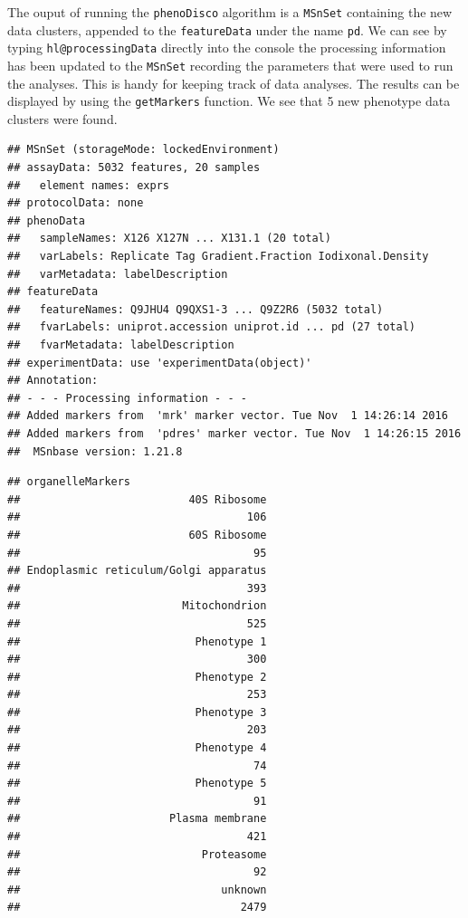 The ouput of running the \texttt{phenoDisco} algorithm is a \texttt{MSnSet}
containing the new data clusters, appended to the \texttt{featureData} under
the name \texttt{pd}. We can see by typing \texttt{hl@processingData} directly into
the console the processing information has been updated to the
\texttt{MSnSet} recording the parameters that were used to run the analyses.
This is handy for keeping track of data analyses. The results can be
displayed by using the \texttt{getMarkers} function. We see that 5 new
phenotype data clusters were found.

\begin{knitrout}
\color{fgcolor}\begin{kframe}
\begin{alltt}
\end{alltt}
\begin{verbatim}
## MSnSet (storageMode: lockedEnvironment)
## assayData: 5032 features, 20 samples 
##   element names: exprs 
## protocolData: none
## phenoData
##   sampleNames: X126 X127N ... X131.1 (20 total)
##   varLabels: Replicate Tag Gradient.Fraction Iodixonal.Density
##   varMetadata: labelDescription
## featureData
##   featureNames: Q9JHU4 Q9QXS1-3 ... Q9Z2R6 (5032 total)
##   fvarLabels: uniprot.accession uniprot.id ... pd (27 total)
##   fvarMetadata: labelDescription
## experimentData: use 'experimentData(object)'
## Annotation:  
## - - - Processing information - - -
## Added markers from  'mrk' marker vector. Tue Nov  1 14:26:14 2016 
## Added markers from  'pdres' marker vector. Tue Nov  1 14:26:15 2016 
##  MSnbase version: 1.21.8
\end{verbatim}
\begin{alltt}
  \hlstd{=} \hlstd{)}
\end{alltt}
\begin{verbatim}
## organelleMarkers
##                          40S Ribosome 
##                                   106 
##                          60S Ribosome 
##                                    95 
## Endoplasmic reticulum/Golgi apparatus 
##                                   393 
##                         Mitochondrion 
##                                   525 
##                           Phenotype 1 
##                                   300 
##                           Phenotype 2 
##                                   253 
##                           Phenotype 3 
##                                   203 
##                           Phenotype 4 
##                                    74 
##                           Phenotype 5 
##                                    91 
##                       Plasma membrane 
##                                   421 
##                            Proteasome 
##                                    92 
##                               unknown 
##                                  2479
\end{verbatim}
\end{kframe}
\end{knitrout}

